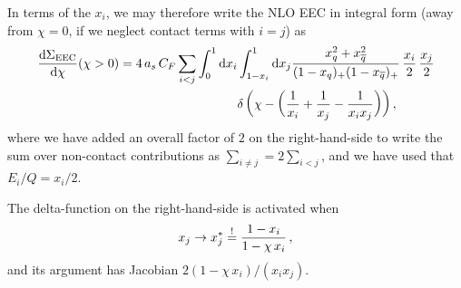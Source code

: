 In terms of the \(x_i\), we may therefore write the NLO EEC in integral form (away from \(\chi = 0\), if we neglect contact terms with \(i=j\)) as
\begin{align}
    \label{eq:ee2hadrons_EEC}
    \frac{\dd\Sigma_\text{EEC}}{\dd\chi}
    (\chi>0)
    =
    4\,
    \ascf
    \sum_{i<j}
    \int_0^1 \dd x_i
    &
    \int_{1-x_i}^1 \dd x_j
    \frac{x_q^2 + x_{\overline{q}}^2}{(1-x_q)_+(1-x_{\overline{q}})_+}
    \,\frac{x_i}{2}
    \,\frac{x_j}{2}
    \\
    &
    \notag
    \delta\le(
        \chi
        -
        \le(
            \frac{1}{x_i} + \frac{1}{x_j} - \frac{1}{x_i x_j}
        \ri)
    \ri)
    ,
\end{align}
where we have added an overall factor of \(2\) on the right-hand-side to write the sum over non-contact contributions as \(\sum_{i \neq j} = 2 \sum_{i < j}\), and we have used that \(E_i/Q = x_i / 2\).

The delta-function on the right-hand-side is activated when
\begin{align}
    x_j \to x_j^* \overset{!}{=} \frac{1-x_i}{1-\chi\,x_i}
    \,,
\end{align}
and its argument has Jacobian \(2(1 - \chi\,x_i)/(x_i x_j)\).

